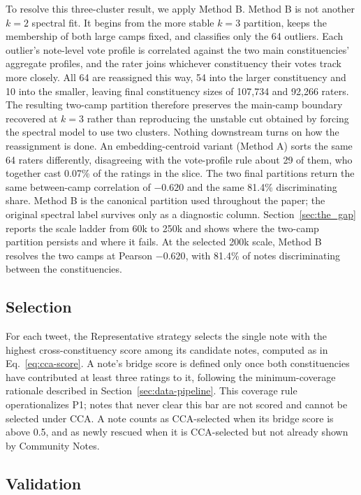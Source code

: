 \documentclass[10pt,twocolumn]{article}
\begin{document}
To resolve this three-cluster result, we apply Method B. Method B is not another
$k=2$ spectral fit. It begins from the more stable
$k=3$ partition, keeps the membership of both large camps fixed, and classifies
only the 64 outliers. Each outlier's note-level vote profile is correlated
against the two main constituencies' aggregate profiles, and the rater joins
whichever constituency their votes track more closely. All 64 are reassigned
this way, 54 into the larger constituency and 10 into the smaller, leaving
final constituency sizes of 107,734 and 92,266 raters. The resulting two-camp
partition therefore preserves the main-camp boundary recovered at $k=3$ rather
than reproducing the unstable cut obtained by forcing the spectral model to
use two clusters. Nothing downstream turns on how the reassignment is done. An
embedding-centroid variant (Method A) sorts the same 64 raters differently,
disagreeing with the vote-profile rule about 29 of them, who together cast
0.07\% of the ratings in the slice. The two final partitions return the same
between-camp correlation of $-0.620$ and the same 81.4\% discriminating share.
Method B is the canonical partition used throughout the paper; the original
spectral label survives only as a diagnostic column. Section~\ref{sec:the_gap}
reports the scale ladder from 60k to 250k and shows where the two-camp
partition persists and where it fails. At the selected 200k scale, Method B
resolves the two camps at Pearson
$-0.620$, with 81.4\% of notes discriminating between the constituencies.

\subsection{Selection}

For each tweet, the Representative strategy selects the single note with the
highest cross-constituency score among its candidate notes, computed as in
Eq.~\eqref{eq:cca-score}. A note's bridge score is defined only once both
constituencies have contributed at least three ratings to it, following the
minimum-coverage rationale described in Section~\ref{sec:data-pipeline}. This
coverage rule operationalizes P1; notes that never clear this bar are not
scored and cannot be selected under CCA. A note counts as CCA-selected when its
bridge score is above 0.5, and as newly rescued when it is CCA-selected but
not already shown by Community Notes.

\subsection{Validation}
\end{document}
